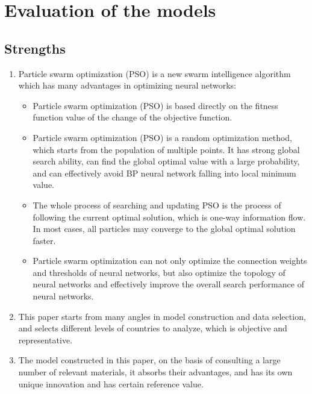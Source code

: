 \documentclass[12pt]{article}  %
\begin{document}
\section{Evaluation of the models}

\subsection{Strengths}

\begin{enumerate}[\bfseries 1.]

\item Particle swarm optimization (PSO) is a new swarm intelligence algorithm which has many advantages in optimizing neural networks:

\begin{itemize}
    \item  Particle swarm optimization (PSO) is based directly on the fitness function value of the change of the objective function.
    \item Particle swarm optimization (PSO) is a random optimization method, which starts from the population of multiple points. It has strong global search ability, can find the global optimal value with a large probability, and can effectively avoid BP neural network falling into local minimum value.
    \item The whole process of searching and updating PSO is the process of following the current optimal solution, which is one-way information flow. In most cases, all particles may converge to the global optimal solution faster.
    \item Particle swarm optimization can not only optimize the connection weights and thresholds of neural networks, but also optimize the topology of neural networks and effectively improve the overall search performance of neural networks.

\end{itemize}

\item This paper starts from many angles in model construction and data selection, and selects different levels of countries to analyze, which is objective and representative.

\item The model constructed in this paper, on the basis of consulting a large number of relevant materials, it absorbs their advantages, and has its own unique innovation and has certain reference value.

\end{enumerate}
\end{document}
